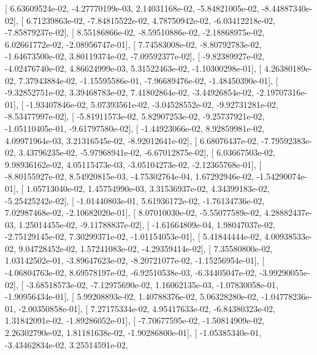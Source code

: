\documentclass{article}
\begin{document}
       [  6.63609524e-02,  -4.27770199e-03,   2.14031168e-02,
         -5.84821005e-02,  -8.44887340e-02],
       [  6.71239863e-02,  -7.84815522e-02,   4.78750942e-02,
         -6.03412218e-02,  -7.85879237e-02],
       [  8.55186866e-02,  -8.59510886e-02,  -2.18868975e-02,
          6.02661772e-02,  -2.08956747e-01],
       [  7.74583008e-02,  -8.80792783e-02,  -1.64673500e-02,
          3.80119374e-02,  -7.09592377e-02],
       [ -9.82389927e-02,  -4.02476740e-02,   4.86624999e-03,
          5.31522463e-02,  -1.10300298e-01],
       [  4.26380189e-02,   7.37943884e-02,  -1.15595586e-01,
         -7.96689476e-02,  -1.48450390e-01],
       [ -9.32852751e-02,   3.39468783e-02,   7.41802864e-02,
         -3.44926854e-02,  -2.19707316e-01],
       [ -1.93407846e-02,   5.07393561e-02,  -3.04528552e-02,
         -9.92731281e-02,  -8.53477997e-02],
       [ -5.81911573e-02,   5.82907253e-02,  -9.25737921e-02,
         -1.05110405e-01,  -9.61797580e-02],
       [ -1.44923066e-02,   8.92859981e-02,   4.09971964e-03,
          3.21316545e-02,  -8.92012641e-02],
       [  6.68076437e-02,  -7.79592383e-02,   3.43796235e-02,
         -5.97968941e-02,  -6.67012875e-02],
       [  6.03667503e-02,   9.98936162e-02,   4.05115473e-03,
         -3.05104273e-02,  -2.12365768e-01],
       [ -8.80155927e-02,   8.54920815e-03,  -4.75302764e-04,
          1.67292946e-02,  -1.54290074e-01],
       [  1.05713040e-02,   1.45754990e-03,   3.31536937e-02,
          4.34399183e-02,  -5.25425242e-02],
       [ -1.01440803e-01,   5.61936172e-02,  -1.76134736e-02,
          7.02987468e-02,  -2.10682020e-01],
       [  8.07010030e-02,  -5.55077589e-02,   4.28882437e-03,
          1.25014455e-02,  -9.11788837e-02],
       [ -1.61664809e-04,   1.98047037e-02,  -2.75129145e-02,
          7.30299371e-02,  -1.01154053e-01],
       [  5.41844444e-02,   4.00938533e-02,   9.04728452e-02,
          1.57241083e-02,  -4.29359414e-02],
       [  7.35580800e-02,   1.03142502e-01,  -3.89647623e-02,
         -8.20721077e-02,  -1.15256954e-01],
       [ -4.06804763e-02,   8.69578197e-02,  -6.92510538e-03,
         -6.34405047e-02,  -3.99290055e-02],
       [ -3.68518573e-02,  -7.12975690e-02,   1.16062135e-03,
         -1.07830058e-01,  -1.90956434e-01],
       [  5.99208893e-02,   1.40788376e-02,   5.06328280e-02,
         -1.04778236e-01,  -2.00350858e-01],
       [  7.27175334e-02,   4.95417633e-02,  -6.84380323e-02,
          1.31842091e-02,  -1.89286052e-01],
       [ -7.70677595e-02,  -1.50814909e-02,   2.26302790e-02,
          1.81181638e-02,  -1.90286800e-01],
       [ -1.05385340e-01,  -3.43462834e-02,   3.25514591e-02,
\end{document}
